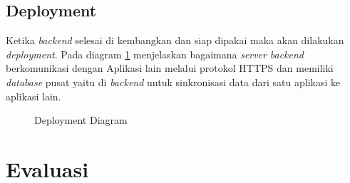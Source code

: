 \newpage

\subsection{Deployment}
Ketika \textit{backend} selesai di kembangkan dan siap dipakai maka akan dilakukan \textit{deployment}.
Pada diagram \ref{deployment} menjelaskan bagaimana \textit{server} \textit{backend} berkomunikasi dengan Aplikasi lain melalui protokol HTTPS dan memiliki \textit{database} pusat yaitu di \textit{backend} untuk sinkronisasi data dari satu aplikasi ke aplikasi lain. 

\begin{figure}[h]
  {\par}
  \caption{Deployment Diagram}
  \label{deployment}
\end{figure}

\newpage

\section{Evaluasi}
